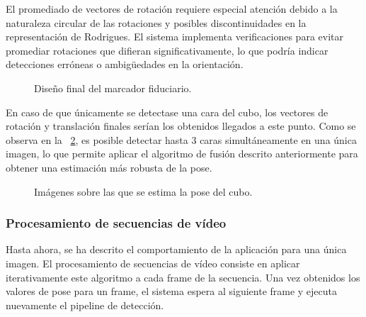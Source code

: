 El promediado de vectores de rotación requiere especial atención debido a la naturaleza circular de las rotaciones y posibles discontinuidades en la representación de Rodrigues. El sistema implementa verificaciones para evitar promediar rotaciones que difieran significativamente, lo que podría indicar detecciones erróneas o ambigüedades en la orientación.


\begin{figure}%
	\centering
	\qquad
	\caption{Diseño final del marcador fiduciario.}%
	\label{fig:cubo_marker}%
\end{figure}

En caso de que únicamente se detectase una cara del cubo, los vectores de rotación y translación finales serían los obtenidos llegados a este punto. Como se observa en la \figurename~\ref{fig:cubo_detected}, es posible detectar hasta 3 caras simultáneamente en una única imagen, lo que permite aplicar el algoritmo de fusión descrito anteriormente para obtener una estimación más robusta de la pose.

\begin{figure}%
	\centering
	\qquad
	\caption{Imágenes sobre las que se estima la pose del cubo.}%
	\label{fig:cubo_detected}%
\end{figure}

\subsubsection{Procesamiento de secuencias de vídeo}
Hasta ahora, se ha descrito el comportamiento de la aplicación para una única imagen. El procesamiento de secuencias de vídeo consiste en aplicar iterativamente este algoritmo a cada frame de la secuencia. Una vez obtenidos los valores de pose para un frame, el sistema espera al siguiente frame y ejecuta nuevamente el pipeline de detección.

